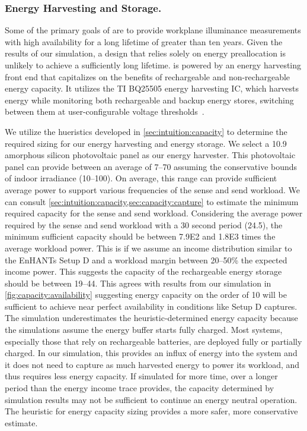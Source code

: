 \subsubsection{Energy Harvesting and Storage.}
Some of the primary goals of \name are to provide workplane illuminance measurements with high availability for a long lifetime of greater than ten years. 
Given the results of our simulation, a design that relies solely on energy preallocation is unlikely to achieve a sufficiently long lifetime. 
\name is powered by an energy harvesting front end that capitalizes on the benefits
of rechargeable and non-rechargeable energy capacity. 
It utilizes the TI BQ25505 energy harvesting IC, which
harvests energy while monitoring both
rechargeable and backup energy stores,
switching between them at user-configurable voltage thresholds~\cite{bq25505}. 

We utilize the hueristics developed in \cref{sec:intuition:capacity} to determine the required sizing for our energy harvesting and energy storage. 
We select a 10.9\ssi{\centi\meter\squared} amorphous
silicon photovoltaic panel as our energy harvester.
This photovoltaic panel can provide between an average of 7--70\ssi{\micro\watt} assuming the conservative bounds of indoor irradiance (10--100\ssi[per-mode=symbol]{\micro\watt\per\centi\meter\squared}).
On average, this range can provide sufficient average power to support various frequencies of the sense and send workload.
We can consult \cref{sec:intuition:capacity,sec:capacity:capture} to estimate the minimum required capacity for the sense and send workload.
Considering the average power required by the sense and send workload with a 30 second period (24.5\ssi{\micro\watt}), 
the minimum sufficient capacity should be between \num{7.9E2} and \num{1.8E3} times the average workload power. This is if we assume an income distribution similar to the EnHANTs Setup D and a workload margin between 20--50\% the expected income power.
This suggests the capacity of the rechargeable energy storage should be between 19--44\ssi{\milli\Wh}.
This agrees with results from our simulation in \cref{fig:capacity:availability} suggesting energy capacity on the order of 10\ssi{\milli\Wh} will be sufficient to achieve near perfect availability in conditions like Setup D captures.
The simulation underestimates the heuristic-determined energy capacity because the simulations assume the energy buffer starts fully charged.
Most systems, especially those that rely on rechargeable batteries, are deployed fully or partially charged.
In our simulation, this provides an influx of energy into the system and it does not need to capture as much harvested energy to power its workload, and thus requires less energy capacity.
If simulated for more time, over a longer period than the energy income trace provides, the capacity determined by simulation results may not be sufficient to continue an energy neutral operation.
The heuristic for energy capacity sizing provides a more safer, more conservative estimate. 

